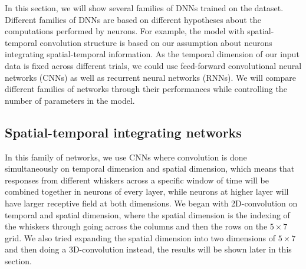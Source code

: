 In this section, we will show several families of DNNs trained on the dataset. Different families of DNNs are based on different hypotheses about the computations performed by neurons. 
For example, the model with spatial-temporal convolution structure is based on our assumption about neurons integrating spatial-temporal information. 
As the temporal dimension of our input data is fixed across different trials, we could use feed-forward convolutional neural networks (CNNs) as well as recurrent neural networks (RNNs).
We will compare different families of networks through their performances while controlling the number of parameters in the model.

\subsection{Spatial-temporal integrating networks}

In this family of networks, we use CNNs where convolution is done simultaneously on temporal dimension and spatial dimension, which means that responses from different whiskers across a specific window of time will be combined together in neurons of every layer, while neurons at higher layer will have larger receptive field at both dimensions.
We began with 2D-convolution on temporal and spatial dimension, where the spatial dimension is the indexing of the whiskers through going across the columns and then the rows on the $5\times7$ grid. 
We also tried expanding the spatial dimension into two dimensions of $5\times7$ and then doing a 3D-convolution instead, the results will be shown later in this section. 

